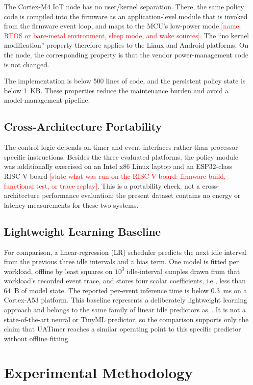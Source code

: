 \documentclass[journal]{IEEEtran}
\newcommand{\authorcheck}[1]{\textcolor{red}{[#1]}}
\begin{document}
The Cortex-M4 IoT node has no user/kernel separation. There, the same policy code is compiled into the firmware as an application-level module that is invoked from the firmware event loop, and  maps to the MCU's low-power mode \authorcheck{name RTOS or bare-metal environment, sleep mode, and wake sources}. The ``no kernel modification'' property therefore applies to the Linux and Android platforms. On the node, the corresponding property is that the vendor power-management code is not changed.

The implementation is below 500 lines of code, and the persistent policy state is below 1~KB. These properties reduce the maintenance burden and avoid a model-management pipeline.

\subsection{Cross-Architecture Portability}
The control logic depends on timer and event interfaces rather than processor-specific instructions. Besides the three evaluated platforms, the policy module was additionally exercised on an Intel x86 Linux laptop and an ESP32-class RISC-V board \authorcheck{state what was run on the RISC-V board: firmware build, functional test, or trace replay}. This is a portability check, not a cross-architecture performance evaluation; the present dataset contains no energy or latency measurements for these two systems.

\subsection{Lightweight Learning Baseline}
For comparison, a linear-regression (LR) scheduler predicts the next idle interval from the previous three idle intervals and a bias term. One model is fitted per workload, offline by least squares on $10^3$ idle-interval samples drawn from that workload's recorded event trace, and stores four scalar coefficients, i.e., less than 64~B of model state. The reported per-event inference time is below 0.3~ms on a Cortex-A53 platform. This baseline represents a deliberately lightweight learning approach and belongs to the same family of linear idle predictors as~\cite{srivastava1996predictive}. It is not a state-of-the-art neural or TinyML predictor, so the comparison supports only the claim that UATimer reaches a similar operating point to this specific predictor without offline fitting.

\section{Experimental Methodology}
\end{document}
